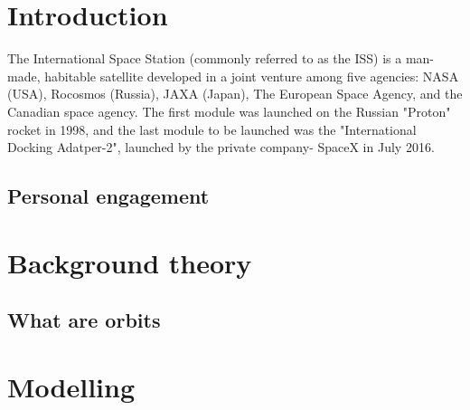 \documentclass[12pt]{article}
\begin{document}
    \tableofcontents
    \thispagestyle{empty}
    \newpage
    
 
    \addtocounter{page}{-1}
    \section{Introduction} %
    The International Space Station (commonly referred to as the ISS) is a man-made, habitable satellite developed in a joint venture among five agencies: NASA (USA), 
    Rocosmos (Russia), JAXA (Japan), The European Space Agency, and the Canadian space agency. The first module was launched on the Russian "Proton" rocket in 1998, 
    and the last module to be launched was the "International Docking Adatper-2", launched by the private company- SpaceX in July 2016.





        


        \subsection{Personal engagement}



    \section{Background theory}
        \subsection{What are orbits}
    \section{Modelling}

    
\end{document}

